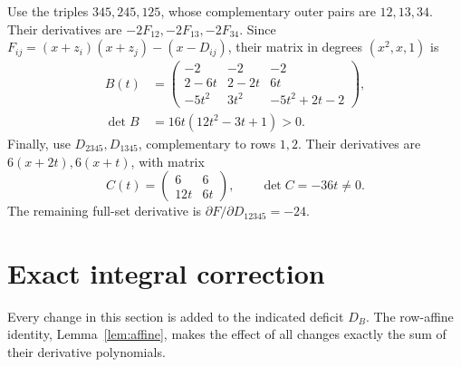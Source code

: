 \documentclass[11pt,a4paper]{article}
\theoremstyle{definition}
\begin{document}
Use the triples $345,245,125$, whose complementary outer pairs are
$12,13,34$. Their derivatives are $-2F_{12},-2F_{13},-2F_{34}$.
Since $F_{ij}=(x+z_i)(x+z_j)-(x-D_{ij})$, their matrix in degrees
$(x^2,x,1)$ is
\begin{equation}\label{eq:B}
 \begin{aligned}
 B(t)&=
 \begin{pmatrix}
 -2&-2&-2\\
 2-6t&2-2t&6t\\
 -5t^2&3t^2&-5t^2+2t-2
 \end{pmatrix},\\
 \det B&=16t(12t^2-3t+1)>0.
 \end{aligned}
\end{equation}
Finally, use $D_{2345},D_{1345}$, complementary to rows $1,2$.
Their derivatives are $6(x+2t),6(x+t)$, with matrix
\begin{equation}\label{eq:C}
 C(t)=\begin{pmatrix}6&6\\12t&6t\end{pmatrix},
 \qquad \det C=-36t\ne0.
\end{equation}
The remaining full-set derivative is
$\partial F/\partial D_{12345}=-24$.

\section{Exact integral correction}\label{sec:lift}

Every change in this section is added to the indicated deficit $D_B$.
The row-affine identity, Lemma~\ref{lem:affine}, makes the effect of all
changes exactly the sum of their derivative polynomials.
\end{document}
